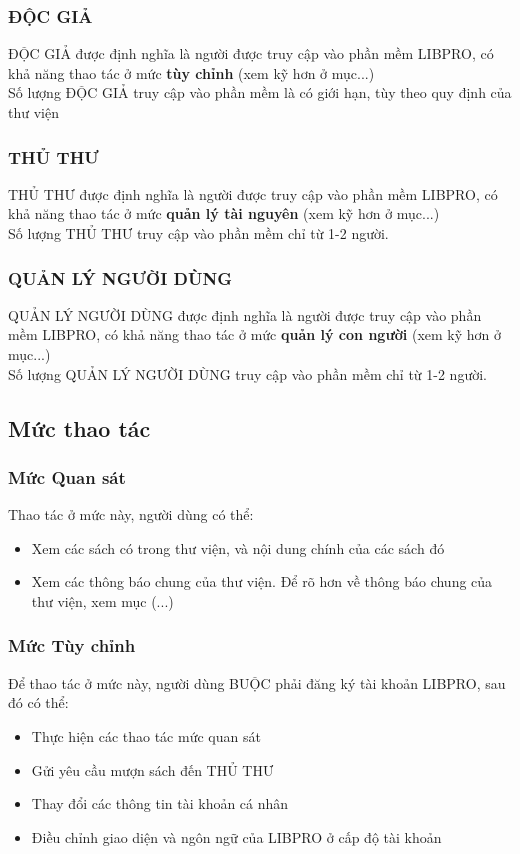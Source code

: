 \documentclass[12pt,a4paper]{report}
\begin{document}
			\subsubsection{ĐỘC GIẢ}
				ĐỘC GIẢ được định nghĩa là người được truy cập vào phần mềm LIBPRO, có khả năng thao tác ở mức \textbf{tùy chỉnh} (xem kỹ hơn ở mục...) \\
				Số lượng ĐỘC GIẢ truy cập vào phần mềm là có giới hạn, tùy theo quy định của thư viện
			\subsubsection{THỦ THƯ}
				THỦ THƯ được định nghĩa là người được truy cập vào phần mềm LIBPRO, có khả năng thao tác ở mức \textbf{quản lý tài nguyên} (xem kỹ hơn ở mục...) \\
				Số lượng THỦ THƯ truy cập vào phần mềm chỉ từ 1-2 người.
			\subsubsection{QUẢN LÝ NGƯỜI DÙNG}
				QUẢN LÝ NGƯỜI DÙNG được định nghĩa là người được truy cập vào phần mềm LIBPRO, có khả năng thao tác ở mức \textbf{quản lý con người} (xem kỹ hơn ở mục...) \\
				Số lượng QUẢN LÝ NGƯỜI DÙNG truy cập vào phần mềm chỉ từ 1-2 người.
		\subsection{Mức thao tác}
			\subsubsection{Mức Quan sát}
			Thao tác ở mức này, người dùng có thể:
			\begin{itemize}
				\item Xem các sách có trong thư viện, và nội dung chính của các sách đó
				\item Xem các thông báo chung của thư viện. Để rõ hơn về thông báo chung của thư viện, xem mục (...)
			\end{itemize}

			\subsubsection{Mức Tùy chỉnh}
			Để thao tác ở mức này, người dùng BUỘC phải đăng ký tài khoản LIBPRO, sau đó có thể:
			\begin{itemize}
				\item Thực hiện các thao tác mức quan sát
				\item Gửi yêu cầu mượn sách đến THỦ THƯ
				\item Thay đổi các thông tin tài khoản cá nhân
				\item Điều chỉnh giao diện và ngôn ngữ của LIBPRO ở cấp độ tài khoản
			\end{itemize}
\end{document}
